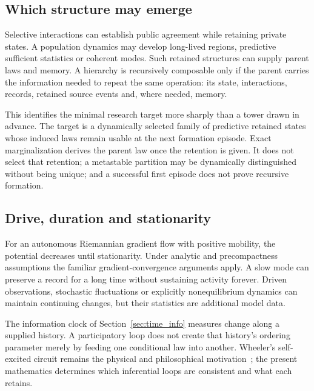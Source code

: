 \subsection{Which structure may emerge}
Selective interactions can establish public agreement while retaining private states. A population dynamics may develop long-lived regions, predictive sufficient statistics or coherent modes. Such retained structures can supply parent laws and memory. A hierarchy is recursively composable only if the parent carries the information needed to repeat the same operation: its state, interactions, records, retained source events and, where needed, memory.

This identifies the minimal research target more sharply than a tower drawn in advance. The target is a dynamically selected family of predictive retained states whose induced laws remain usable at the next formation episode. Exact marginalization derives the parent law once the retention is given. It does not select that retention; a metastable partition may be dynamically distinguished without being unique; and a successful first episode does not prove recursive formation.

\subsection{Drive, duration and stationarity}
For an autonomous Riemannian gradient flow with positive mobility, the potential decreases until stationarity. Under analytic and precompactness assumptions the familiar gradient-convergence arguments apply. A slow mode can preserve a record for a long time without sustaining activity forever. Driven observations, stochastic fluctuations or explicitly nonequilibrium dynamics can maintain continuing changes, but their statistics are additional model data.

The information clock of Section~\ref{sec:time_info} measures change along a supplied history. A participatory loop does not create that history's ordering parameter merely by feeding one conditional law into another. Wheeler's self-excited circuit remains the physical and philosophical motivation~\cite{Wheeler1983,Wheeler1990}; the present mathematics determines which inferential loops are consistent and what each retains.

